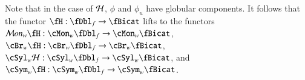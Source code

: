 Note that in the case of $\mathcal{H}$, $\phi$ and $\phi_u$ have globular components. It follows that the functor $\fH: \fDbl_f \rightarrow \fBicat$ lifts to the functors $\cM on_w \fH: \cMon_w\fDbl_f \rightarrow \cMon_w \fBicat$, $\cBr_w \fH: \cBr_w\fDbl_f \rightarrow \cBr_w \fBicat$,  $\cSyl_w\cH: \cSyl_w\fDbl_f \rightarrow \cSyl_w\fBicat$, and $\cSym_w \fH: \cSym_w\fDbl_f \rightarrow \cSym_w \fBicat$.


